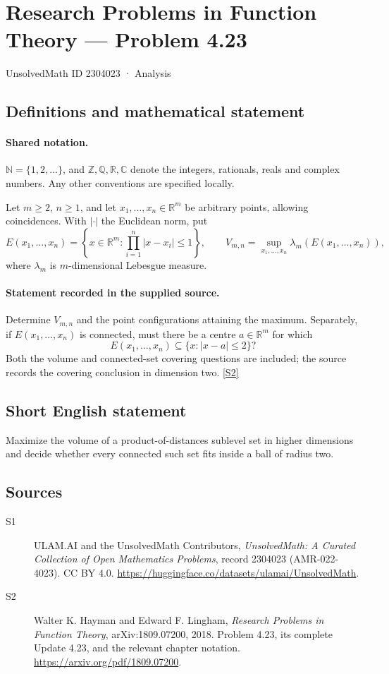 \documentclass[11pt]{book}
\newcommand{\sref}[2]{\hyperlink{source:#1:#2}{[S#2]}}
\begin{document}
\setcounter{section}{2304022}
\section{Research Problems in Function Theory — Problem 4.23}\label{2304023}
{\small\sffamily UnsolvedMath ID 2304023 · Analysis}
\subsection{Definitions and mathematical statement}

\paragraph{Shared notation.}$\mathbb N=\{1,2,\ldots\}$, and $\mathbb Z,\mathbb Q,\mathbb R,\mathbb C$ denote the integers, rationals, reals and complex numbers. Any other conventions are specified locally.


Let $m\ge2$, $n\ge1$, and let $x_1,\ldots,x_n\in\mathbb R^m$ be arbitrary points, allowing coincidences. With $|\cdot|$ the Euclidean norm, put
\[E(x_1,\ldots,x_n)=\left\{x\in\mathbb R^m:\prod_{i=1}^n|x-x_i|\le1\right\},\qquad
 V_{m,n}=\sup_{x_1,\ldots,x_n}\lambda_m(E(x_1,\ldots,x_n)),
\]
where $\lambda_m$ is $m$-dimensional Lebesgue measure.
\paragraph{Statement recorded in the supplied source.}
Determine $V_{m,n}$ and the point configurations attaining the maximum. Separately, if $E(x_1,\ldots,x_n)$ is connected, must there be a centre $a\in\mathbb R^m$ for which
\[E(x_1,\ldots,x_n)\subseteq\{x:|x-a|\le2\}?\]
Both the volume and connected-set covering questions are included; the source records the covering conclusion in dimension two. \sref{2304023}{2}
\subsection{Short English statement}
Maximize the volume of a product-of-distances sublevel set in higher dimensions and decide whether every connected such set fits inside a ball of radius two.
\subsection{Sources}
\begin{description}
\item[\hypertarget{source:2304023:1}{S1}] ULAM.AI and the UnsolvedMath Contributors, \emph{UnsolvedMath: A Curated Collection of Open Mathematics Problems}, record 2304023 (AMR-022-4023). CC BY 4.0. \url{https://huggingface.co/datasets/ulamai/UnsolvedMath}.
\item[\hypertarget{source:2304023:2}{S2}] Walter K. Hayman and Edward F. Lingham, \emph{Research Problems in Function Theory}, arXiv:1809.07200, 2018. Problem 4.23, its complete Update 4.23, and the relevant chapter notation. \url{https://arxiv.org/pdf/1809.07200}.
\end{description}
\label{end:2304023}
\end{document}
